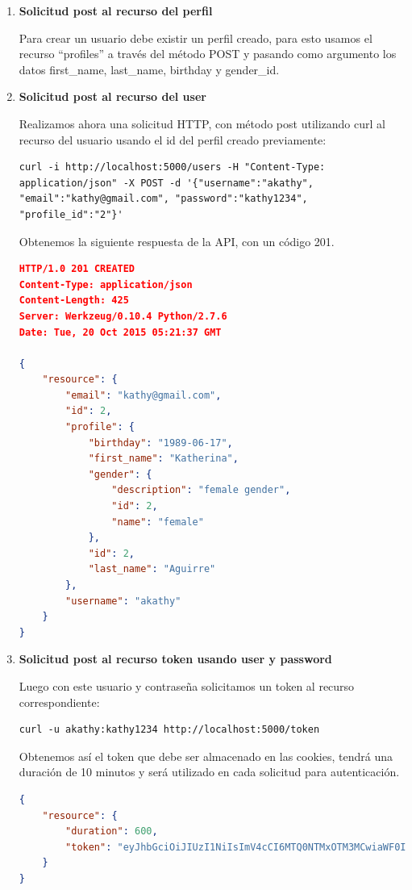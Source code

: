 \begin{enumerate}
	\item \textbf{Solicitud post al recurso del perfil}
    
	Para crear un usuario debe existir un perfil creado, para esto usamos el recurso ``\/profiles'' a través del método POST y pasando como argumento los datos first\_name, last\_name, birthday y gender\_id.
    \item \textbf{Solicitud post al recurso del user}
    
    Realizamos ahora una solicitud HTTP, con método post utilizando curl al recurso del usuario usando el id del perfil creado previamente:

\begin{verbatim}
curl -i http://localhost:5000/users -H "Content-Type: 
application/json" -X POST -d '{"username":"akathy", 
"email":"kathy@gmail.com", "password":"kathy1234", 
"profile_id":"2"}'
\end{verbatim}
    
    Obtenemos la siguiente respuesta de la API, con un código 201.
    
\begin{lstlisting}[language=json]
HTTP/1.0 201 CREATED
Content-Type: application/json
Content-Length: 425
Server: Werkzeug/0.10.4 Python/2.7.6
Date: Tue, 20 Oct 2015 05:21:37 GMT

{
    "resource": {
        "email": "kathy@gmail.com", 
        "id": 2, 
        "profile": {
            "birthday": "1989-06-17", 
            "first_name": "Katherina", 
            "gender": {
                "description": "female gender", 
                "id": 2, 
                "name": "female"
            }, 
            "id": 2, 
            "last_name": "Aguirre"
        }, 
        "username": "akathy"
    }
}
\end{lstlisting}

    \item \textbf{Solicitud post al recurso token usando user y password}
    
    Luego con este usuario y contraseña solicitamos un token al recurso correspondiente:

\begin{verbatim}
curl -u akathy:kathy1234 http://localhost:5000/token
\end{verbatim}
   
   Obtenemos así el token que debe ser almacenado en las cookies, tendrá una duración de 10 minutos y será utilizado en cada solicitud para autenticación.
   
\begin{lstlisting}[language=json]
{
    "resource": {
        "duration": 600, 
        "token": "eyJhbGciOiJIUzI1NiIsImV4cCI6MTQ0NTMxOTM3MCwiaWF0IjoxNDQ1MzE4NzcwfQ.eyJpZCI6Mn0.2eZRjbMq9tg4GykJx8EU-Ux4ZoyUW6WnBlADsvnpQvE"
    }
}
\end{lstlisting}

\end{enumerate}

